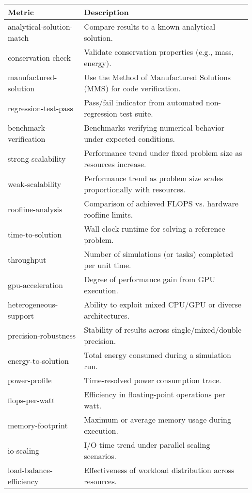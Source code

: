 \begin{longtable}{@{}p{}p{}@{}}
\toprule
\textbf{Metric} & \textbf{Description} \\
\midrule
\endhead

analytical-solution-match & Compare results to a known analytical solution. \\
conservation-check         & Validate conservation properties (e.g., mass, energy). \\
manufactured-solution      & Use the Method of Manufactured Solutions (MMS) for code verification. \\
regression-test-pass       & Pass/fail indicator from automated non-regression test suite. \\
benchmark-verification     & Benchmarks verifying numerical behavior under expected conditions. \\
strong-scalability         & Performance trend under fixed problem size as resources increase. \\
weak-scalability           & Performance trend as problem size scales proportionally with resources. \\
roofline-analysis          & Comparison of achieved FLOPS vs. hardware roofline limits. \\
time-to-solution           & Wall-clock runtime for solving a reference problem. \\
throughput                 & Number of simulations (or tasks) completed per unit time. \\
gpu-acceleration           & Degree of performance gain from GPU execution. \\
heterogeneous-support      & Ability to exploit mixed CPU/GPU or diverse architectures. \\
precision-robustness       & Stability of results across single/mixed/double precision. \\
energy-to-solution         & Total energy consumed during a simulation run. \\
power-profile              & Time-resolved power consumption trace. \\
flops-per-watt             & Efficiency in floating-point operations per watt. \\
memory-footprint           & Maximum or average memory usage during execution. \\
io-scaling                 & I/O time trend under parallel scaling scenarios. \\
load-balance-efficiency    & Effectiveness of workload distribution across resources. \\

\end{longtable}
